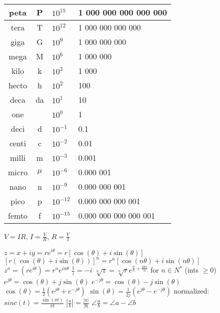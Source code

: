 \documentclass[12pt]{article}
\begin{document}
\begin{spacing}{0.8}
\begin{multicols*}{2}
\begin{flushleft}
\begin{outline}[longenum]
 \\
\begin{tabular}{|c c l l|}                                   \hline
peta  & P     & $10^{ 15}$ & \hfill 1 000 000 000 000 000 \\ \hline
tera  & T     & $10^{ 12}$ & \hfill     1 000 000 000 000 \\ \hline
giga  & G     & $10^{  9}$ & \hfill         1 000 000 000 \\ \hline
mega  & M     & $10^{  6}$ & \hfill             1 000 000 \\ \hline
kilo  & k     & $10^{  3}$ & \hfill                 1 000 \\ \hline
hecto & h     & $10^{  2}$ & \hfill                   100 \\ \hline
deca  & da    & $10^{  1}$ & \hfill                    10 \\ \hline
one   &       & $10^{ 0 }$ & \hfill       1 \hfill \hfill \\ \hline
deci  & d     & $10^{- 1}$ & 0.1                          \\ \hline
centi & c     & $10^{- 2}$ & 0.01                         \\ \hline
milli & m     & $10^{- 3}$ & 0.001                        \\ \hline
micro & $\mu$ & $10^{- 6}$ & 0.000 001                    \\ \hline
nano  & n     & $10^{- 9}$ & 0.000 000 001                \\ \hline
pico  & p     & $10^{-12}$ & 0.000 000 000 001            \\ \hline
femto & f     & $10^{-15}$ & 0.000 000 000 000 001        \\ \hline
\end{tabular}

  $V = IR$,
  \quad $I = \frac{V}{R}$,
  \quad $R = \frac{V}{I}$


  \1 $z = x+iy = re^{i\theta} = r[\cos(\theta)+i\sin(\theta)]$
  \1 $[r(\cos(\theta)+i\sin(\theta))]^n = r^n[\cos(n\theta)+i\sin(n\theta)]$
  \1 $z^n = (re^{i\theta}) = r^ne^{in\theta}$
  \1 $\frac{1}{i}=-i$
  \1 $\sqrt[n]{z} = \sqrt[n]{r}e^{\frac{\theta}{n}+\frac{2k\pi}{n}}$ for $n\in N^*$ (ints $\geq0$)
  \1 $e^{j\theta} = \cos(\theta) + j\sin(\theta)$
  \1 $e^{-j\theta} = \cos(\theta) - j\sin(\theta)$
  \1 $\cos(\theta) = \frac{1}{2}(e^{j\theta} + e^{-j\theta})$
  \1 $\sin(\theta) = \frac{1}{2j}(e^{j\theta} - e^{-j\theta})$
  \1 normalized: $sinc(t) = \frac{\sin(\pi t)}{\pi t}$
  \1 $|\frac{a}{b}| = \frac{|a|}{|b|}$
  \1 $\angle\frac{a}{b} = \angle{a} - \angle{b}$


\end{outline}
\end{flushleft}
\end{multicols*}
\end{spacing}
\end{document}
